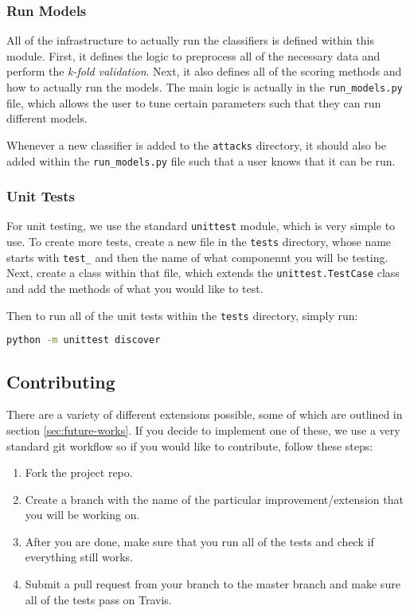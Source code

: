 \newpage

\subsubsection{Run Models}

All of the infrastructure to actually run the classifiers is defined within this module.
First, it defines the logic to preprocess all of the necessary data and perform the \textit{k-fold validation}.
Next, it also defines all of the scoring methods and how to actually run the models.
The main logic is actually in the \texttt{run\_models.py} file, which allows the user to tune certain parameters such that they can run different models.

Whenever a new classifier is added to the \texttt{attacks} directory, it should also be added within the \texttt{run\_models.py} file such that a user knows that it can be run.

\subsubsection{Unit Tests}

For unit testing, we use the standard \texttt{unittest} module, which is very simple to use.
To create more tests, create a new file in the \texttt{tests} directory, whose name starts with \texttt{test\_} and then the name of what componennt you will be testing.
Next, create a class within that file, which extends the \texttt{unittest.TestCase} class and add the methods of what you would like to test.

Then to run all of the unit tests within the \texttt{tests} directory, simply run:
\begin{lstlisting}[language=Bash]
python -m unittest discover
\end{lstlisting}

\subsection{Contributing}

There are a variety of different extensions possible, some of which are outlined in section \ref{sec:future-works}.
If you decide to implement one of these, we use a very standard git workflow so if you would like to contribute, follow these steps:

\begin{enumerate}
  \item Fork the project repo.
  \item Create a branch with the name of the particular improvement/extension that you will be working on.
  \item After you are done, make sure that you run all of the tests and check if everything still works.
  \item Submit a pull request from your branch to the master branch and make sure all of the tests pass on Travis.
\end{enumerate}

